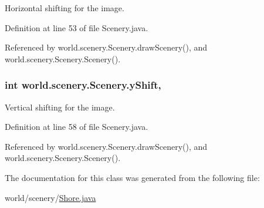 Horizontal shifting for the image. 



Definition at line 53 of file Scenery.\-java.



Referenced by world.\-scenery.\-Scenery.\-draw\-Scenery(), and world.\-scenery.\-Scenery.\-Scenery().

\hypertarget{classworld_1_1scenery_1_1_scenery_ac9ca2c17cf6920deffe490c013b0e638}{
\subsubsection[{y\-Shift}]{\setlength{\rightskip}{0pt plus 5cm}int world.\-scenery.\-Scenery.\-y\-Shift\hspace{0.3cm}{\ttfamily [protected]}, {\ttfamily [inherited]}}}\label{classworld_1_1scenery_1_1_scenery_ac9ca2c17cf6920deffe490c013b0e638}


Vertical shifting for the image. 



Definition at line 58 of file Scenery.\-java.



Referenced by world.\-scenery.\-Scenery.\-draw\-Scenery(), and world.\-scenery.\-Scenery.\-Scenery().



The documentation for this class was generated from the following file\-:\begin{DoxyCompactItemize}
\item 
world/scenery/\hyperlink{_shore_8java}{Shore.\-java}\end{DoxyCompactItemize}
